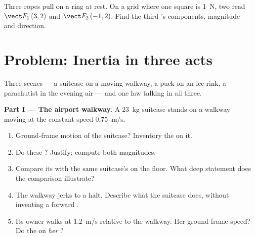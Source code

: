 \begin{exercise}[$\star\star\star$]\label{exo:g10:inertia:15}
Three ropes pull on a ring at rest. On a grid where one square is
\qty{1}{N}, two  read $\vect F_1\,(3, 2)$ and
$\vect F_2\,(-1, 2)$. Find the third 's components, magnitude and
direction.
\end{exercise}

\section{Problem: Inertia in three acts}

\begin{problem}
\label{pb:g10:inertia:1}
Three scenes --- a suitcase on a moving walkway, a puck on an ice rink,
a parachutist in the evening air --- and one law talking in all three.

\medskip
\noindent\textbf{Part I --- The airport walkway.}
A \qty{23}{kg} suitcase stands on a walkway moving at the constant
speed \qty{0.75}{m/s}.
\begin{enumerate}
  \item Ground-frame motion of the suitcase? Inventory the  on it.
  \item Do these  ? Justify; compute both magnitudes.
  \item Compare its  with the same suitcase's on the
        floor. What deep statement does the comparison illustrate?
  \item The walkway jerks to a halt. Describe what the suitcase does,
        without inventing a forward .
  \item Its owner walks at \qty{1.2}{m/s} relative to the walkway. Her
        ground-frame speed? Do the  on \emph{her} ?
\end{enumerate}


\end{problem}
